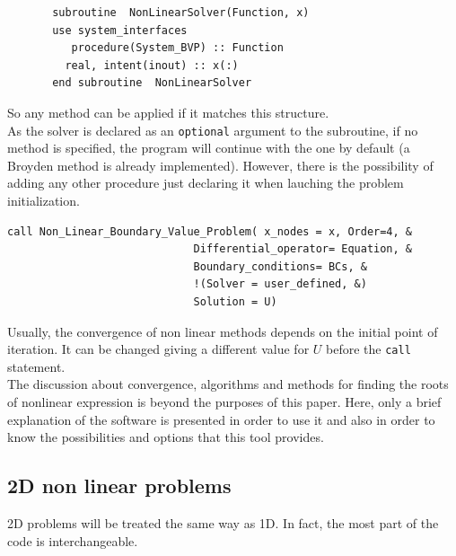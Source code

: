 \begin{blueframed}
\begin{lstlisting}
       subroutine  NonLinearSolver(Function, x)
       use system_interfaces
          procedure(System_BVP) :: Function
         real, intent(inout) :: x(:)
       end subroutine  NonLinearSolver
\end{lstlisting}
\end{blueframed}

So any method can be applied if it matches this structure. \\

As the solver is declared as an \texttt{optional} argument to the subroutine, if
no method is specified, the program will continue with the one by default (a
Broyden method is already implemented). However, there is the possibility of
adding any other procedure just declaring it when lauching the problem
initialization. 

\begin{blueframed}
\begin{lstlisting}
call Non_Linear_Boundary_Value_Problem( x_nodes = x, Order=4, &
                             Differential_operator= Equation, &
                             Boundary_conditions= BCs, &
                             !(Solver = user_defined, &)
                             Solution = U)
\end{lstlisting}
\end{blueframed}

Usually, the convergence of non linear methods depends on the initial point of
iteration. It can be changed giving a different value for $U$ before the
\texttt{call} statement. \\

The discussion about convergence, algorithms and methods for finding the roots
of nonlinear expression is beyond the purposes of this paper. Here, only a brief
explanation of the software is presented in order to use it and also in order to
know the possibilities and options that this tool provides. \\

\subsection{ 2D non linear problems}

2D problems will be treated the same way as 1D. In fact, the most part of the
code is interchangeable. \\

